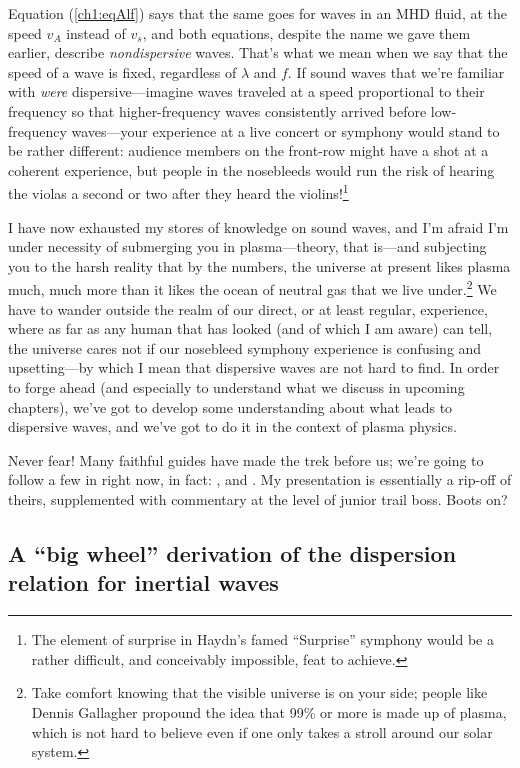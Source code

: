 Equation (\ref{ch1:eqAlf}) says that the same goes for waves in an MHD
fluid, at the speed $v_A$ instead of $v_s$, and both equations,
despite the name we gave them earlier, describe \emph{nondispersive}
waves. That's what we mean when we say that the speed of a wave is
fixed, regardless of $\lambda$ and $f$. If sound waves that we're
familiar with \emph{were} dispersive---imagine waves traveled at a
speed proportional to their frequency so that higher-frequency waves
consistently arrived before low-frequency waves---your experience at a
live concert or symphony would stand to be rather different: audience
members on the front-row might have a shot at a coherent experience,
but people in the nosebleeds would run the risk of hearing the violas
a second or two after they heard the violins!\footnote{The element of
  surprise in Haydn's famed ``Surprise'' symphony would be a rather
  difficult, and conceivably impossible, feat to achieve.}

I have now exhausted my stores of knowledge on sound waves, and I'm
afraid I'm under necessity of submerging you in plasma---theory, that
is---and subjecting you to the harsh reality that by the numbers, the
universe at present likes plasma much, much more than it likes the
ocean of neutral gas that we live under.\footnote{Take comfort knowing
  that the visible universe is on your side; people like Dennis
  Gallagher propound the idea that 99\% or more is made up of plasma,
  which is not hard to believe even if one only takes a stroll around
  our solar system.} We have to wander outside the realm of our
direct, or at least regular, experience, where as far as any human
that has looked (and of which I am aware) can tell, the universe cares
not if our nosebleed symphony experience is confusing and
upsetting---by which I mean that dispersive waves are not hard to
find. In order to forge ahead (and especially to understand what we
discuss in upcoming chapters), we've got to develop some understanding
about what leads to dispersive waves, and we've got to do it in the
context of plasma physics.

Never fear! Many faithful guides have made the trek before us; we're
going to follow a few in right now, in fact: \citet{Goertz1979}, and
\citet{Kletzing1994}. My presentation is essentially a rip-off of
theirs, supplemented with commentary at the level of junior trail
boss. Boots on?

\subsection[A ``big wheel'' derivation of the IAW dispersion
relation]{A ``big wheel'' derivation of the dispersion relation for inertial \Alf
  waves}

